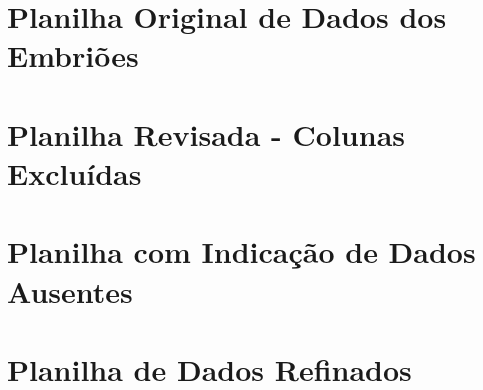 \begin{landscape}
\begin{anexosenv}

\renewcommand{\thechapter}{\Roman{chapter}}
\partanexos


\chapter{Planilha Original de Dados dos Embriões}
\label{anexo:planilha-original}


\begin{center}
    
    
    
    
\end{center}

\chapter{Planilha Revisada - Colunas Excluídas}
\label{anexo:planilha-revisada}


\chapter{Planilha com Indicação de Dados Ausentes}
\label{anexo:planilha-dados-ausentes}

\chapter{Planilha de Dados Refinados}
\label{anexo:planilha-refinada}

\end{anexosenv}
\end{landscape}


